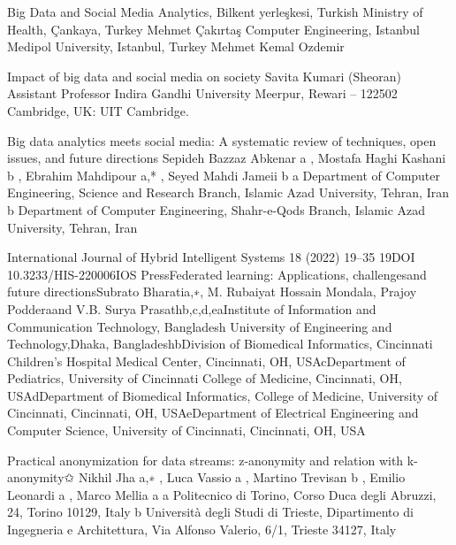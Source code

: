 \documentclass[openacc]{rsproca_new}%
\begin{document}
\begin{thebibliography}{9}

Big Data and Social Media Analytics, Bilkent yerleşkesi, Turkish Ministry of Health, Çankaya, Turkey
Mehmet Çakırtaş
Computer Engineering, Istanbul Medipol University, Istanbul, Turkey
Mehmet Kemal Ozdemir 

 Impact of big data and social media on society
Savita Kumari 
(Sheoran) Assistant Professor Indira Gandhi University Meerpur, Rewari – 122502
 Cambridge, UK: UIT Cambridge.

 Big data analytics meets social media: A systematic review of 
techniques, open issues, and future directions 
Sepideh Bazzaz Abkenar a
, Mostafa Haghi Kashani b
, Ebrahim Mahdipour a,*
, 
Seyed Mahdi Jameii b 
a Department of Computer Engineering, Science and Research Branch, Islamic Azad University, Tehran, Iran b Department of Computer Engineering, Shahr-e-Qods Branch, Islamic Azad University, Tehran, Iran 

International Journal of Hybrid Intelligent Systems 18 (2022) 19–35 19DOI 10.3233/HIS-220006IOS PressFederated learning: Applications, challengesand future directionsSubrato Bharatia,∗, M. Rubaiyat Hossain Mondala, Prajoy Podderaand V.B. Surya Prasathb,c,d,eaInstitute of Information and Communication Technology, Bangladesh University of Engineering and Technology,Dhaka, BangladeshbDivision of Biomedical Informatics, Cincinnati Children’s Hospital Medical Center, Cincinnati, OH, USAcDepartment of Pediatrics, University of Cincinnati College of Medicine, Cincinnati, OH, USAdDepartment of Biomedical Informatics, College of Medicine, University of Cincinnati, Cincinnati, OH, USAeDepartment of Electrical Engineering and Computer Science, University of Cincinnati, Cincinnati, OH, USA

Practical anonymization for data streams: z-anonymity and
relation with k-anonymity✩
Nikhil Jha a,∗
, Luca Vassio a
, Martino Trevisan b
, Emilio Leonardi a
, Marco Mellia a
a
Politecnico di Torino, Corso Duca degli Abruzzi, 24, Torino 10129, Italy
b Università degli Studi di Trieste, Dipartimento di Ingegneria e Architettura, Via Alfonso Valerio, 6/1, Trieste 34127, Italy

\end{thebibliography}
\end{document}

